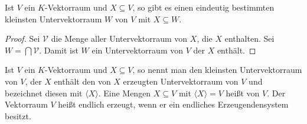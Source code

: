 \begin{proposition}
	Ist $V$ ein $K$-Vektorraum und $X \subseteq V$, so gibt es einen eindeutig bestimmten kleinsten Untervektorraum $W$ von $V$
	mit $X \subseteq W$.
\end{proposition}
\begin{proof}
	Sei $\mathcal V$ die Menge aller Untervektorraum von $X$, die $X$ enthalten. Sei $W=\bigcap \mathcal V$. Damit ist 
	$W$ ein Untervektorraum von $V$ der $X$ enthält.
\end{proof}

\begin{definition}[Erzeugendensystem]
	Ist $V$ ein $K$-Vektorraum und $X\subseteq V$, so nennt man den kleinsten Untervektorraum von 
	$V$, der $X$ enthält den von $X$ erzeugten Untervektorraum von $V$ und bezeichnet diesen mit $\langle X\rangle$. Eine Mengen $X\subseteq V$ 
	mit $\langle X\rangle=V$ heißt  von $V$. Der Vektorraum $V$ heißt endlich erzeugt, wenn er ein endliches Erzeugendensystem 
	besitzt.
\end{definition}